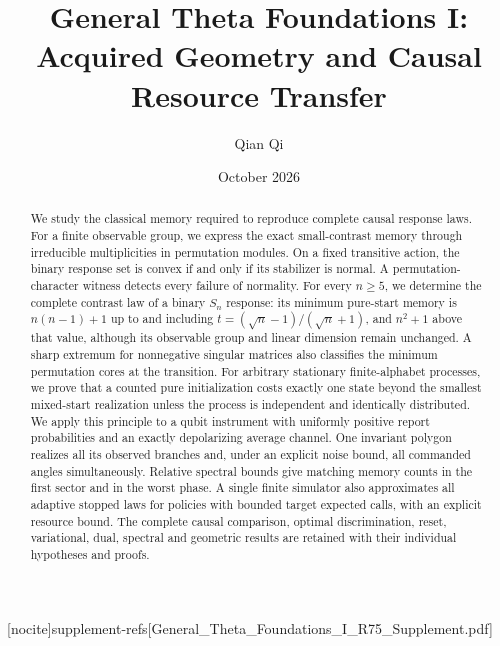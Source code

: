 
[nocite]{supplement-refs}[General_Theta_Foundations_I_R75_Supplement.pdf]
\title[Acquired geometry and causal resource transfer]{General Theta Foundations I:\\Acquired Geometry and Causal Resource Transfer}
\author{Qian Qi}\date{October 2026}

\begin{abstract}
We study the classical memory required to reproduce complete causal
response laws. For a finite observable group, we express the exact
small-contrast memory through irreducible multiplicities in permutation
modules. On a fixed transitive action, the binary response set is
convex if and only if its stabilizer is normal. A permutation-character
witness detects every failure of normality. For every $n\ge5$, we determine
the complete contrast law of a binary $S_n$ response: its minimum
pure-start memory is $n(n-1)+1$ up to and including
$t=(\sqrt n-1)/(\sqrt n+1)$, and $n^2+1$ above that value, although its
observable group and linear dimension remain unchanged. A sharp extremum
for nonnegative singular matrices also classifies the minimum permutation
cores at the transition. For arbitrary
stationary finite-alphabet processes, we prove that a counted pure
initialization costs exactly one state beyond the smallest mixed-start
realization unless the process is independent and identically distributed.
We apply this principle to a qubit instrument with uniformly positive
report probabilities and an exactly depolarizing average channel.
One invariant polygon realizes all
its observed branches and, under an explicit noise bound, all commanded
angles simultaneously. Relative spectral bounds give matching memory
counts in the first sector and in the worst phase. A single finite
simulator also approximates all adaptive stopped laws for policies with
bounded target expected calls, with an explicit resource bound. The complete
causal comparison, optimal discrimination, reset, variational, dual,
spectral and geometric results are retained with their individual
hypotheses and proofs.
\end{abstract}
\maketitle













